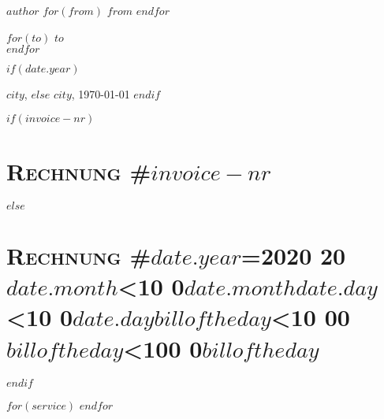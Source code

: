 \documentclass[$fontsize$, a4paper]{article}
\renewcommand{\arraystretch}{1.5} %
\gdef\TotalHT{0}
\begin{document}
\small
\textsc{\textbf{$author$}}
$for(from)$
\textbullet{} \textsc{$from$}
$endfor$

\vspace{1em}

\normalsize \sffamily
$for(to)$
$to$\\
$endfor$

\vspace{6em}

\begin{flushright}
  \small
  $if(date.year)$
    \date{}
    $city$, 
  $else$
    $city$, \today
  $endif$
\end{flushright}

\vspace{1em}

$if(invoice-nr)$
  \section*{\textsc{Rechnung} \textsc{\#$invoice-nr$}}
$else$
  \section*{\textsc{Rechnung} \textsc{\#\ifnum $date.year$=2020 20\else {} \fi
  \ifnum $date.month$<10 0\fi $date.month$\ifnum $date.day$<10 0\fi $date.day$\ifnum $billoftheday$<10 00\else \ifnum $billoftheday$<100 0\fi\fi $billoftheday$}}
$endif$
\footnotesize

\renewcommand\arraystretch{1.5}
\setcounter{pos}{0}

\setlength\dashlinedash{0.2pt}
\setlength\dashlinegap{1.5pt}
\setlength\arrayrulewidth{0.3pt}

$for(service)$
  \FPmul{}
  \FPround{}
  \FPadd\total{\TotalHT}{\temp}
  \FPround{}
  \global\let\TotalHT\total
$endfor$
\end{document}
